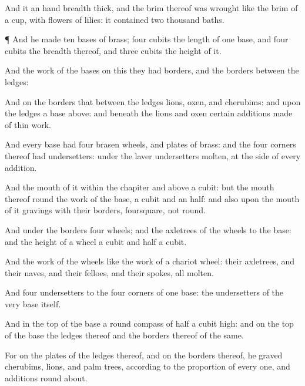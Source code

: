 {And it
{} an hand
breadth
thick, and the
brim thereof was
wrought like the
brim of a
cup, with
flowers of
lilies: it
contained two
thousand
baths.


\par }{\PP {}¶ And he
made
ten
bases of
brass;
four
cubits
{} the
length of
one
base, and
four
cubits the
breadth thereof, and
three
cubits the
height of it.

And the
work of the
bases
{} on this
{} they had
borders, and the
borders
{} between the
ledges:

And on the
borders that
{} between the
ledges
{}
lions,
oxen, and
cherubims: and upon the
ledges
{} a
base
above: and beneath the
lions and
oxen
{} certain
additions made of
thin
work.

And
every
base had
four
brasen
wheels, and
plates of
brass: and the
four
corners thereof had
undersetters: under the
laver
{}
undersetters
molten, at the
side of
every
addition.

And the
mouth of it
within the
chapiter and
above
{} a
cubit: but the
mouth thereof
{}
round
{} the
work of the
base, a
cubit and an
half: and also upon the
mouth of it
{}
gravings with their
borders,
foursquare, not
round.

And
under the
borders
{}
four
wheels; and the
axletrees of the
wheels
{} to the
base: and the
height of
a
wheel
{} a
cubit and
half a
cubit.

And the
work of the
wheels
{} like the
work of a
chariot
wheel: their
axletrees, and their
naves, and their
felloes, and their
spokes,
{} all
molten.

And
{}
four
undersetters to the
four
corners of
one
base:
{} the
undersetters
{} of the very
base itself.

And in the
top of the
base
{} a
round
compass of
half a
cubit
high: and on the
top of the
base the
ledges thereof and the
borders thereof
{} of the same.

For on the
plates of the
ledges thereof, and on the
borders thereof, he
graved
cherubims,
lions, and palm
trees, according to the
proportion of every
one, and
additions round
about.

}
